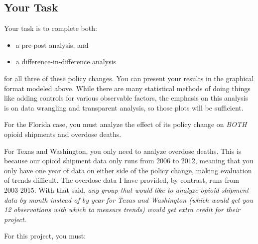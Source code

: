 \documentclass[12pt]{article}
\begin{document}
\subsection*{Your Task}

Your task is to complete both:

\begin{itemize}
  \item a pre-post analysis, and
  \item a difference-in-difference analysis
\end{itemize}

for all three of these policy changes. You can present your results in the graphical format modeled above. While there are many statistical methods of doing things like adding controls for various observable factors, the emphasis on this analysis is on data wrangling and transparent analysis, so those plots will be sufficient.

For the Florida case, you must analyze the effect of its policy change on \emph{BOTH} opioid shipments and overdose deaths.

For Texas and Washington, you only need to analyze overdose deaths. This is because our opioid shipment data only runs from 2006 to 2012, meaning that you only have one year of data on either side of the policy change, making evaluation of trends difficult. The overdose data I have provided, by contrast, runs from 2003-2015. With that said, \emph{any group that would like to analyze opioid shipment data \emph{by month} instead of by year for Texas and Washington (which would get you 12 observations with which to measure trends) would get extra credit for their project.}

For this project, you must:
\end{document}
